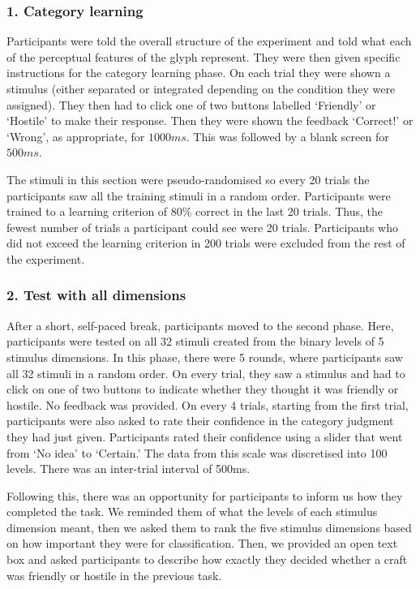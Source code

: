 \documentclass[doc, a4paper, apacite]{apa6}
\begin{document}
\subsubsection{1. Category learning} 
Participants were told the overall structure of the experiment and told what each of the perceptual features of the glyph represent. 
They were then given specific instructions for the category learning phase. 
On each trial they were shown a stimulus (either separated or integrated depending on the condition they were assigned).
They then had to click one of two buttons labelled `Friendly' or `Hostile' to make their response.
Then they were shown the feedback `Correct!' or `Wrong', as appropriate, for $1000ms$.
This was followed by a blank screen for $500ms$.

The stimuli in this section were pseudo-randomised so every 20 trials the participants saw all the training stimuli in a random order. 
Participants were trained to a learning criterion of 80\% correct in the last 20 trials. 
Thus, the fewest number of trials a participant could see were 20 trials. 
Participants who did not exceed the learning criterion in 200 trials were excluded from the rest of the experiment. 

\subsubsection{2. Test with all dimensions}
After a short, self-paced break, participants moved to the second phase. 
Here, participants were tested on all 32 stimuli created from the binary levels of 5 stimulus dimensions. 
In this phase, there were 5 rounds, where participants saw all 32 stimuli in a random order. 
On every trial, they saw a stimulus and had to click on one of two buttons to indicate whether they thought it was friendly or hostile. 
No feedback was provided. 
On every 4 trials, starting from the first trial, participants were also asked to rate their confidence in the category judgment they had just given. 
Participants rated their confidence using a slider that went from `No idea' to `Certain.'
The data from this scale was discretised into 100 levels. 
There was an inter-trial interval of 500ms. 

Following this, there was an opportunity for participants to inform us how they completed the task. 
We reminded them of what the levels of each stimulus dimension meant, then we asked them to rank the five stimulus dimensions based on how important they were for classification. 
Then, we provided an open text box and asked participants to describe how exactly they decided whether a craft was friendly or hostile in the previous task.
\end{document}
